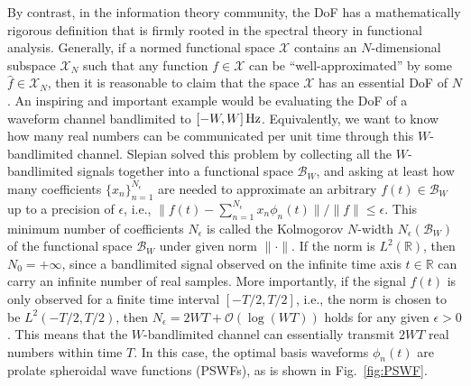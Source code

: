 \documentclass[journal,twocolumn]{IEEEtran}
\begin{document}
By contrast, in the information theory community, the DoF has a mathematically rigorous definition that is firmly rooted in the spectral theory in functional analysis. 
Generally, if a normed functional space $\mathcal{X}$ contains an $N$-dimensional subspace $\mathcal{X}_N$ such that any function $f\in\mathcal{X}$ can be ``well-approximated'' by some $\hat{f}\in\mathcal{X}_N$, then it is reasonable to claim that the space $\mathcal{X}$ has an essential DoF of $N$.  
An inspiring and important example would be evaluating the DoF of a waveform channel bandlimited to $[-W, W]\, {\rm Hz}$. Equivalently, we want to know how many real numbers can be communicated per unit time through this $W$-bandlimited channel. 
Slepian solved this problem by collecting all the $W$-bandlimited signals together into a functional space $\mathcal{B}_W$, and asking at least how many coefficients $\{x_n\}_{n=1}^{N_\epsilon}$ are needed to approximate an arbitrary $f(t)\in \mathcal{B}_W$ up to a precision of $\epsilon$, i.e., $\|f(t)-\sum_{n=1}^{N_\epsilon}x_n\phi_n(t)\|/\|f\|\leq \epsilon$.
This minimum number of coefficients $N_\epsilon$ is called the Kolmogorov $N$-width $N_\epsilon(\mathcal{B}_W)$ of the functional space $\mathcal{B}_W$ under given norm $\|\cdot\|$. If the norm is $L^2(\mathbb{R})$, then $N_0=+\infty$, since a bandlimited signal observed on the infinite time axis $t\in \mathbb{R}$ can carry an infinite number of real samples. More importantly, if the signal $f(t)$ is only observed for a finite time interval $[-T/2, T/2]$, i.e., the norm is chosen to be $L^2(-T/2, T/2)$, then $N_\epsilon=2WT+\mathcal{O}(\log (WT))$ holds for any given $\epsilon>0$. This means that the $W$-bandlimited channel can essentially transmit $2WT$ real numbers within time $T$. In this case, the optimal basis waveforms $\phi_n(t)$ are prolate spheroidal wave functions (PSWFs), as is shown in Fig.~\ref{fig:PSWF}. 
\end{document}
